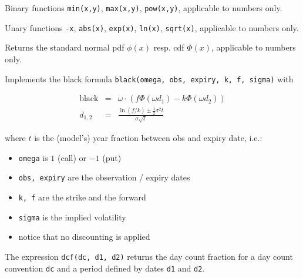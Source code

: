 
Binary functions {\tt min(x,y)}, {\tt max(x,y)}, {\tt pow(x,y)}, applicable to numbers only.


Unary functions {\tt -x}, {\tt abs(x)}, {\tt exp(x)}, {\tt ln(x)}, {\tt sqrt(x)}, applicable to numbers only.


Returns the standard normal pdf $\phi(x)$ resp. cdf $\Phi(x)$, applicable to numbers only.


Implements the black formula {\tt black(omega, obs, expiry, k, f, sigma)} with

\begin{eqnarray*}
  \text{black} &=&  \omega\cdot(f \Phi(\omega d_1) -k \Phi(\omega d_2)) \\
  d_{1,2} &=& \frac{\ln(f/k) \pm \frac{1}{2} \sigma^2t}{\sigma\sqrt{t}}
\end{eqnarray*}
    
where $t$ is the (model's) year fraction between obs and expiry date, i.e.:
\begin{itemize}
\item {\tt omega} is $1$ (call) or $-1$ (put)
\item {\tt obs, expiry} are the observation / expiry dates
\item {\tt k, f} are the strike and the forward
\item {\tt sigma} is the implied volatility
\item notice that no discounting is applied
\end{itemize}


The expression \verb+dcf(dc, d1, d2)+ returns the day count fraction for a day count convention \verb+dc+ and a period
defined by dates \verb+d1+ and \verb+d2+.

